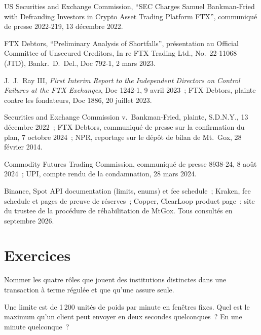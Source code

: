 \begin{omsources}
\item US Securities and Exchange Commission, ``SEC Charges Samuel Bankman-Fried with Defrauding Investors
in Crypto Asset Trading Platform FTX'', communiqué de presse 2022-219, 13 décembre 2022.
\item FTX Debtors, ``Preliminary Analysis of Shortfalls'', présentation au Official Committee of Unsecured
Creditors, In re FTX Trading Ltd., No.\ 22-11068 (JTD), Bankr.\ D.\ Del., Doc 792-1, 2 mars 2023.
\item J.~J.~Ray III, \emph{First Interim Report to the Independent Directors on Control Failures
at the FTX Exchanges}, Doc 1242-1, 9 avril 2023~; FTX Debtors, plainte contre les fondateurs, Doc 1886, 20 juillet 2023.
\item Securities and Exchange Commission v.\ Bankman-Fried, plainte, S.D.N.Y., 13 décembre 2022~; FTX Debtors, communiqué de
presse sur la confirmation du plan, 7 octobre 2024~; NPR, reportage sur le dépôt de bilan de Mt.~Gox, 28 février 2014.
\item Commodity Futures Trading Commission, communiqué de presse 8938-24, 8 août 2024~; UPI, compte rendu de la
condamnation, 28 mars 2024.
\item Binance, Spot API documentation (limits, enums) et fee schedule~; Kraken, fee schedule et pages de preuve
de réserves~; Copper, ClearLoop product page~; site du trustee de la procédure de réhabilitation de MtGox. Tous consultés en
septembre 2026.
\end{omsources}

\section{Exercices}

\begin{exercise}[$\star$]\label{exo:m3:centralised-exchanges:1}
Nommer les quatre rôles que jouent des institutions distinctes dans une transaction à terme régulée et que
qu'une  assure seule.
\end{exercise}

\begin{exercise}[$\star$]\label{exo:m3:centralised-exchanges:2}
Une limite est de 1\,200 unités de poids par minute en fenêtres fixes. Quel est le maximum qu'un client peut envoyer en
deux secondes quelconques~? En une minute quelconque~?
\end{exercise}

